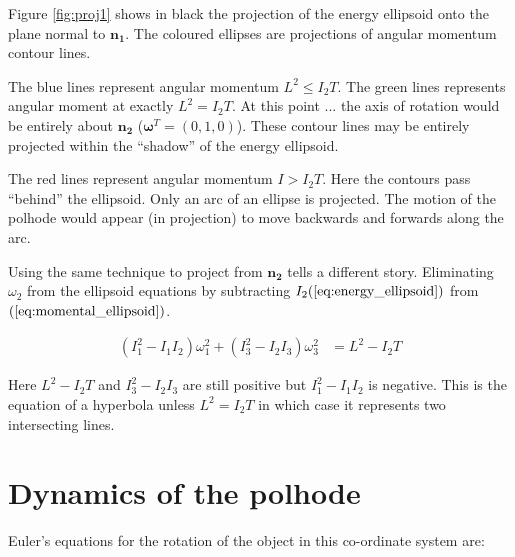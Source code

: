 \documentclass[a4paper, 12pt]{article}
\begin{document}
Figure \ref{fig:proj1} shows in black the projection of the energy ellipsoid onto the plane normal to $\bm{n_1}$. The coloured ellipses are projections of angular momentum contour lines. 

The blue lines represent angular momentum $L^2\leq I_2T$. The green lines represents angular moment at exactly $L^2=I_2T$. At this point ... the axis of rotation would be entirely about $\bm{n_2}$ ($\bm{\omega}^T=(0, 1, 0)$). These contour lines may be entirely projected within the ``shadow'' of the energy ellipsoid. 

The red lines represent angular momentum $I > I_2T$. Here the contours pass ``behind'' the ellipsoid. Only an arc of an ellipse is projected. The motion of the polhode would appear (in projection) to move backwards and forwards along the arc.

Using the same technique to project from $\bm{n_2}$ tells a different story. Eliminating $\omega_2$ from the ellipsoid equations by subtracting $I_2(\ref{eq:energy_ellipsoid})$ from $(\ref{eq:momental_ellipsoid})$.

\begin{align}
  (I_1^2 - I_1I_2)\omega_1^2 + (I_3^2-I_2I_3)\omega_3^2 & = L^2 - I_2T\label{eq:momell13}
\end{align}

Here $L^2 - I_2T$ and $I_3^2-I_2I_3$ are still positive but $I_1^2 - I_1I_2$ is negative. This is the equation of a hyperbola unless $L^2=I_2T$ in which case it represents two intersecting lines.


\section{Dynamics of the polhode}

Euler's equations for the rotation of the object in this co-ordinate system are:
\end{document}
